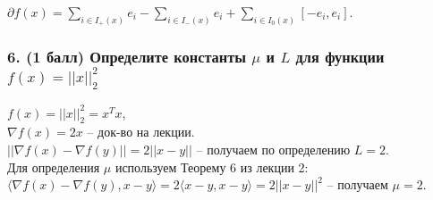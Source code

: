 \documentclass{article}
\begin{document}
$\partial f(x) = \sum_{i \in I_+(x)} e_i - \sum_{i \in I_-(x)} e_i + \sum_{i \in I_0(x)} [-e_i, e_i]$.

\subsubsection*{6. (1 балл) Определите константы $\mu$ и $L$ для функции $f(x) = ||x||^2_2$}
$f(x) = ||x||^2_2 = x^Tx$,\\
$\nabla f(x) = 2x$ -- док-во на лекции.\\
$||\nabla f(x) - \nabla f(y)|| = 2||x - y||$ -- получаем по определению $L = 2$.\\
Для определения $\mu$ используем Теорему 6 из лекции 2:\\
$\langle \nabla f(x) - \nabla f(y), x - y \rangle = 2 \langle x - y, x - y \rangle 
= 2 ||x - y||^2$ -- получаем $\mu = 2$.
\end{document}

